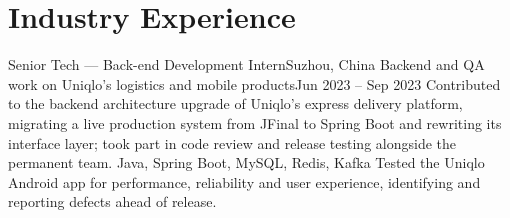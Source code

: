\section{Industry Experience}
  \resumeSubHeadingListStart
    \resumeSubheading
      {Senior Tech --- Back-end Development Intern}{Suzhou, China}
      {Backend and QA work on Uniqlo's logistics and mobile products}{Jun 2023 -- Sep 2023}
      \resumeItemListStart
          {Contributed to the backend architecture upgrade of Uniqlo's express delivery platform, migrating a live production system from JFinal to Spring Boot and rewriting its interface layer; took part in code review and release testing alongside the permanent team. Java, Spring Boot, MySQL, Redis, Kafka}
          {Tested the Uniqlo Android app for performance, reliability and user experience, identifying and reporting defects ahead of release.}
      \resumeItemListEnd
  \resumeSubHeadingListEnd
